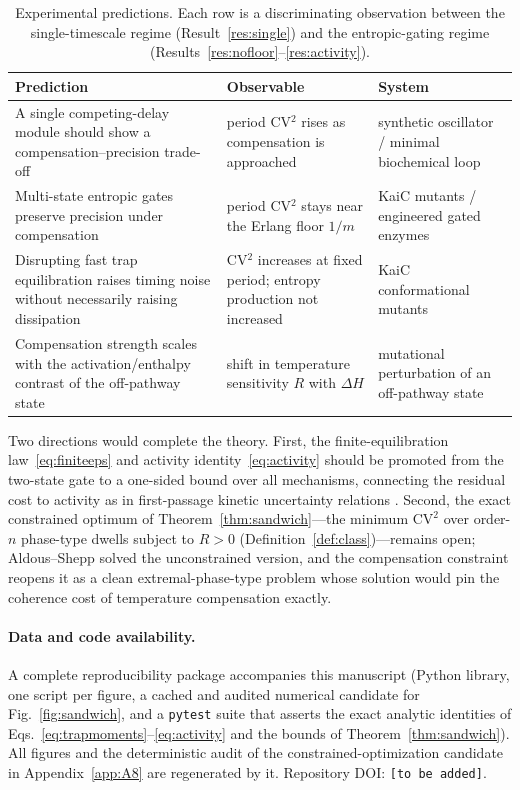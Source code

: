 \documentclass[11pt,onecolumn]{article}
\theoremstyle{definition}
\newcommand{\CV}{\mathrm{CV}}
\begin{document}
\begin{table}[t]
\centering
\small
\caption{Experimental predictions. Each row is a discriminating observation between the single-timescale regime (Result~\ref{res:single}) and the entropic-gating regime (Results~\ref{res:nofloor}--\ref{res:activity}).}
\label{tab:predictions}
\begin{tabular}{L{5.2cm} L{4.6cm} L{4.0cm}}
\toprule
\textbf{Prediction} & \textbf{Observable} & \textbf{System} \\
\midrule
A single competing-delay module should show a compensation--precision trade-off & period CV$^2$ rises as compensation is approached & synthetic oscillator / minimal biochemical loop \\
\addlinespace
Multi-state entropic gates preserve precision under compensation & period CV$^2$ stays near the Erlang floor $1/m$ & KaiC mutants / engineered gated enzymes \\
\addlinespace
Disrupting fast trap equilibration raises timing noise without necessarily raising dissipation & CV$^2$ increases at fixed period; entropy production not increased & KaiC conformational mutants \\
\addlinespace
Compensation strength scales with the activation/enthalpy contrast of the off-pathway state & shift in temperature sensitivity $R$ with $\Delta H$ & mutational perturbation of an off-pathway state \\
\bottomrule
\end{tabular}
\end{table}

Two directions would complete the theory. First, the finite-equilibration law~\eqref{eq:finiteeps} and activity identity~\eqref{eq:activity} should be promoted from the two-state gate to a one-sided bound over all mechanisms, connecting the residual cost to activity as in first-passage kinetic uncertainty relations \cite{Garrahan2017,Hiura2021}. Second, the exact constrained optimum of Theorem~\ref{thm:sandwich}---the minimum $\CV^2$ over order-$n$ phase-type dwells subject to $R>0$ (Definition~\ref{def:class})---remains open; Aldous--Shepp \cite{AldousShepp1987} solved the unconstrained version, and the compensation constraint reopens it as a clean extremal-phase-type problem whose solution would pin the coherence cost of temperature compensation exactly.

\paragraph{Data and code availability.} A complete reproducibility package accompanies this manuscript (Python library, one script per figure, a cached and audited numerical candidate for Fig.~\ref{fig:sandwich}, and a \texttt{pytest} suite that asserts the exact analytic identities of Eqs.~\eqref{eq:trapmoments}--\eqref{eq:activity} and the bounds of Theorem~\ref{thm:sandwich}). All figures and the deterministic audit of the constrained-optimization candidate in Appendix~\ref{app:A8} are regenerated by it. Repository DOI: \texttt{[to be added]}.
\end{document}
